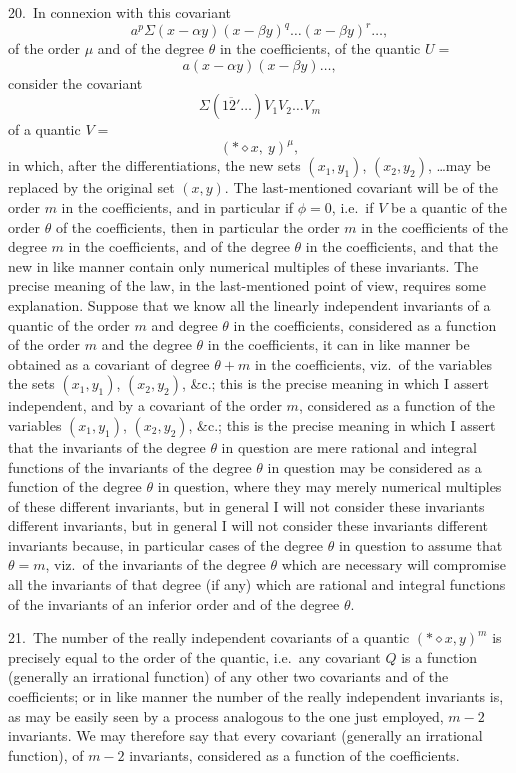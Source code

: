 \documentclass[11pt,a4paper]{article}
\begin{document}
20.\ In connexion with this covariant
\[
a^p \Sigma(x - \alpha y)(x - \beta y)^q\ldots (x - \beta y)^r\ldots,
\]
of the order $\mu$ and of the degree $\theta$ in the coefficients, of the quantic $U =$
\[
a(x - \alpha y)(x - \beta y)\ldots,
\]
consider the covariant
\[
\Sigma(\overline{12'}\ldots)V_1 V_2 \ldots V_m
\]
of a quantic $V =$
\[
(*\diamond x,\ y)^\mu,
\]
in which, after the differentiations, the new sets $(x_1, y_1)$, $(x_2, y_2)$, \ldots may be replaced by the original set $(x, y)$. The last-mentioned covariant will be of the order $m$ in the coefficients, and in particular if $\phi = 0$, i.e.\ if $V$ be a quantic of the order $\theta$ of the coefficients, then in particular the order $m$ in the coefficients of the degree $m$ in the coefficients, and of the degree $\theta$ in the coefficients, and that the new in like manner contain only numerical multiples of these invariants. The precise meaning of the law, in the last-mentioned point of view, requires some explanation. Suppose that we know all the linearly independent invariants of a quantic of the order $m$ and degree $\theta$ in the coefficients, considered as a function of the order $m$ and the degree $\theta$ in the coefficients, it can in like manner be obtained as a covariant of degree $\theta + m$ in the coefficients, viz.\ of the variables the sets $(x_1, y_1)$, $(x_2, y_2)$, \&c.; this is the precise meaning in which I assert independent, and by a covariant of the order $m$, considered as a function of the variables $(x_1, y_1)$, $(x_2, y_2)$, \&c.; this is the precise meaning in which I assert that the invariants of the degree $\theta$ in question are mere rational and integral functions of the invariants of the degree $\theta$ in question may be considered as a function of the degree $\theta$ in question, where they may merely numerical multiples of these different invariants, but in general I will not consider these invariants different invariants, but in general I will not consider these invariants different invariants because, in particular cases of the degree $\theta$ in question to assume that $\theta = m$, viz.\ of the invariants of the degree $\theta$ which are necessary will compromise all the invariants of that degree (if any) which are rational and integral functions of the invariants of an inferior order and of the degree $\theta$.

\medskip

21.\ The number of the really independent covariants of a quantic $(*\diamond x, y)^m$ is precisely equal to the order of the quantic, i.e.\ any covariant $Q$ is a function (generally an irrational function) of any other two covariants and of the coefficients; or in like manner the number of the really independent invariants is, as may be easily seen by a process analogous to the one just employed, $m - 2$ invariants. We may therefore say that every covariant (generally an irrational function), of $m - 2$ invariants, considered as a function of the coefficients.
\end{document}

